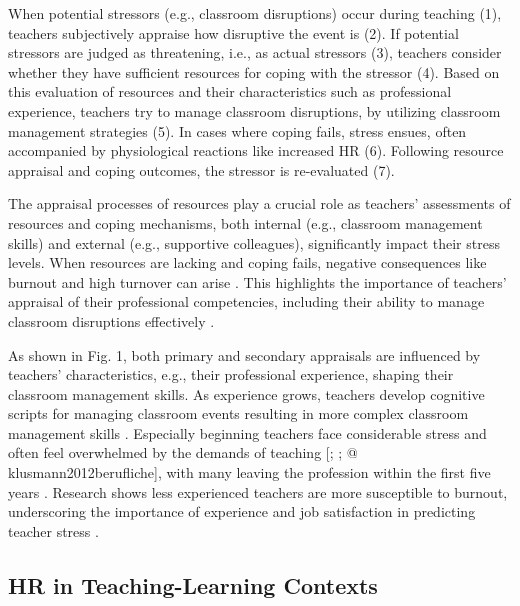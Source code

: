 \documentclass[]{elsarticle} %
\begin{document}
When potential stressors (e.g., classroom disruptions) occur during
teaching (1), teachers subjectively appraise how disruptive the event is
(2). If potential stressors are judged as threatening, i.e., as actual
stressors (3), teachers consider whether they have sufficient resources
for coping with the stressor (4). Based on this evaluation of resources
and their characteristics such as professional experience, teachers try
to manage classroom disruptions, by utilizing classroom management
strategies (5). In cases where coping fails, stress ensues, often
accompanied by physiological reactions like increased HR (6). Following
resource appraisal and coping outcomes, the stressor is re-evaluated
(7).

The appraisal processes of resources play a crucial role as teachers'
assessments of resources and coping mechanisms, both internal (e.g.,
classroom management skills) and external (e.g., supportive colleagues),
significantly impact their stress levels. When resources are lacking and
coping fails, negative consequences like burnout and high turnover can
arise \citep{jalongo2006, unterbrink2007, aloe2014}. This highlights the
importance of teachers' appraisal of their professional competencies,
including their ability to manage classroom disruptions effectively
\citep{klieme2008concept, konig2016teacher}.

As shown in Fig. 1, both primary and secondary appraisals are influenced
by teachers' characteristics, e.g., their professional experience,
shaping their classroom management skills. As experience grows, teachers
develop cognitive scripts for managing classroom events resulting in
more complex classroom management skills \citep{wolff2021classroom}.
Especially beginning teachers face considerable stress and often feel
overwhelmed by the demands of teaching
{[}\citet{ophardt2017klassenmanagement}; \citet{wolff2015keeping}; @
klusmann2012berufliche{]}, with many leaving the profession within the
first five years \citep{ingersoll2003}. Research shows less experienced
teachers are more susceptible to burnout, underscoring the importance of
experience and job satisfaction in predicting teacher stress
\citep{fisher2011}.

\hypertarget{hr-in-teaching-learning-contexts}{%
\subsection{HR in Teaching-Learning
Contexts}\label{hr-in-teaching-learning-contexts}}
\end{document}
